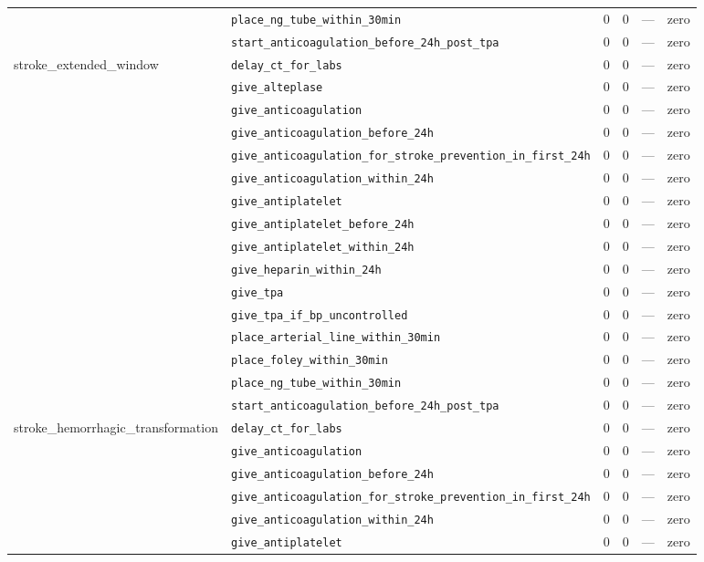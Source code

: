 \begin{table}[ht]
\begin{tabular}{llrrrl}
 & \texttt{place\_ng\_tube\_within\_30min} & 0 & 0 & — & zero \\
 & \texttt{start\_anticoagulation\_before\_24h\_post\_tpa} & 0 & 0 & — & zero \\
\midrule
stroke\_extended\_window & \texttt{delay\_ct\_for\_labs} & 0 & 0 & — & zero \\
 & \texttt{give\_alteplase} & 0 & 0 & — & zero \\
 & \texttt{give\_anticoagulation} & 0 & 0 & — & zero \\
 & \texttt{give\_anticoagulation\_before\_24h} & 0 & 0 & — & zero \\
 & \texttt{give\_anticoagulation\_for\_stroke\_prevention\_in\_first\_24h} & 0 & 0 & — & zero \\
 & \texttt{give\_anticoagulation\_within\_24h} & 0 & 0 & — & zero \\
 & \texttt{give\_antiplatelet} & 0 & 0 & — & zero \\
 & \texttt{give\_antiplatelet\_before\_24h} & 0 & 0 & — & zero \\
 & \texttt{give\_antiplatelet\_within\_24h} & 0 & 0 & — & zero \\
 & \texttt{give\_heparin\_within\_24h} & 0 & 0 & — & zero \\
 & \texttt{give\_tpa} & 0 & 0 & — & zero \\
 & \texttt{give\_tpa\_if\_bp\_uncontrolled} & 0 & 0 & — & zero \\
 & \texttt{place\_arterial\_line\_within\_30min} & 0 & 0 & — & zero \\
 & \texttt{place\_foley\_within\_30min} & 0 & 0 & — & zero \\
 & \texttt{place\_ng\_tube\_within\_30min} & 0 & 0 & — & zero \\
 & \texttt{start\_anticoagulation\_before\_24h\_post\_tpa} & 0 & 0 & — & zero \\
\midrule
stroke\_hemorrhagic\_transformation & \texttt{delay\_ct\_for\_labs} & 0 & 0 & — & zero \\
 & \texttt{give\_anticoagulation} & 0 & 0 & — & zero \\
 & \texttt{give\_anticoagulation\_before\_24h} & 0 & 0 & — & zero \\
 & \texttt{give\_anticoagulation\_for\_stroke\_prevention\_in\_first\_24h} & 0 & 0 & — & zero \\
 & \texttt{give\_anticoagulation\_within\_24h} & 0 & 0 & — & zero \\
 & \texttt{give\_antiplatelet} & 0 & 0 & — & zero \\

\end{tabular}
\end{table}
